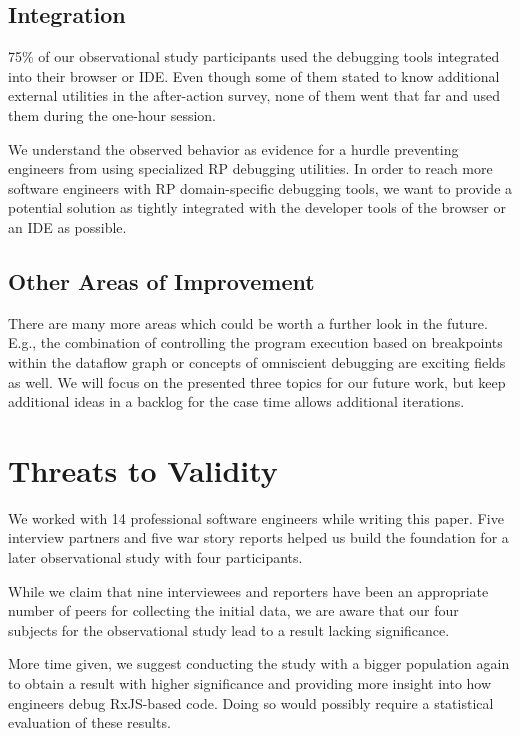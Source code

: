\documentclass[12pt,a4paper]{article}
\begin{document}
\subsection{Integration}

75\% of our observational study participants used the debugging tools integrated into their browser or IDE. Even though some of them stated to know additional external utilities in the after-action survey, none of them went that far and used them during the one-hour session.

We understand the observed behavior as evidence for a hurdle preventing engineers from using specialized RP debugging utilities. In order to reach more software engineers with RP domain-specific debugging tools, we want to provide a potential solution as tightly integrated with the developer tools of the browser or an IDE as possible.

\subsection{Other Areas of Improvement}

There are many more areas which could be worth a further look in the future. E.g., the combination of controlling the program execution based on breakpoints within the dataflow graph or concepts of omniscient debugging are exciting fields as well. We will focus on the presented three topics for our future work, but keep additional ideas in a backlog for the case time allows additional iterations.

\section{Threats to Validity}
\label{sec:threats}

We worked with 14 professional software engineers while writing this paper. Five interview partners and five war story reports helped us build the foundation for a later observational study with four participants.

While we claim that nine interviewees and reporters have been an appropriate number of peers for collecting the initial data, we are aware that our four subjects for the observational study lead to a result lacking significance.

More time given, we suggest conducting the study with a bigger population again to obtain a result with higher significance and providing more insight into how engineers debug RxJS-based code. Doing so would possibly require a statistical evaluation of these results.
\end{document}
